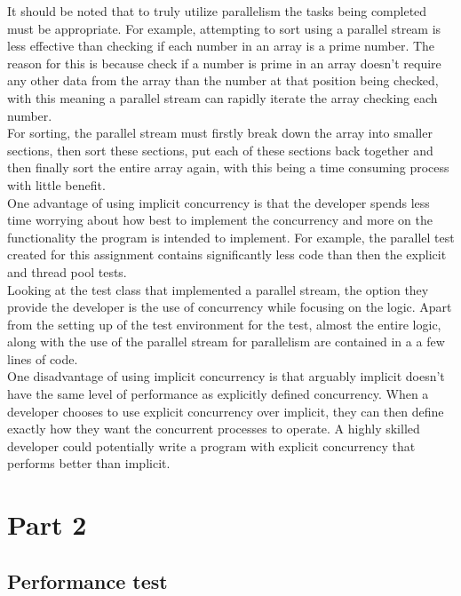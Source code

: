 \documentclass[10pt]{article}  %
\theoremstyle{definition}
\theoremstyle{remark}
\begin{document}
It should be noted that to truly utilize parallelism the tasks being completed must be appropriate. For example, attempting to sort using a parallel stream is less effective than checking if each number in an array is a prime number. The reason for this is because check if a number is prime in an array doesn't require any other data from the array than the number at that position being checked, with this meaning a parallel stream can rapidly iterate the array checking each number.\\

 For sorting, the parallel stream must  firstly break down the array into smaller sections, then sort these sections, put each of these sections back together and then finally sort the entire array again, with this being a time consuming process with little benefit.\\

One advantage of using implicit concurrency is that the developer spends less time worrying about how best to implement the concurrency and more on the functionality the program is intended to implement. For example, the parallel test created for this assignment contains significantly less code than then the explicit and thread pool tests.\\

Looking at the test class that implemented a parallel stream, the option they provide the developer is the use of concurrency while focusing on the logic. Apart from the setting up of the test environment for the test, almost the entire logic, along with the use of the parallel stream for parallelism are contained in a a few lines of code. \\

One disadvantage of using implicit concurrency is that arguably implicit doesn't have the same level of performance as explicitly defined concurrency\cite{O_P}. When a developer chooses to use explicit concurrency over implicit, they can then define exactly how they want the concurrent processes to operate. A highly skilled developer could potentially write a program with explicit concurrency that performs better than implicit.\\
\newpage

\section{Part 2}\label{s:intro}

\subsection{Performance test}\label{ss:back}
\end{document}
